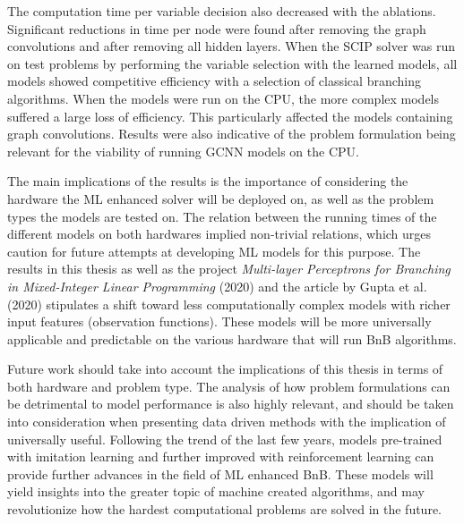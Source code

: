 The computation time per variable decision also decreased with the ablations. Significant reductions in time per node were found after removing the graph convolutions and after removing all hidden layers. When the \gls{SCIP} solver was run on test problems by performing the variable selection with the learned models, all models showed competitive efficiency with a selection of classical branching algorithms. When the models were run on the \gls{CPU}, the more complex models suffered a large loss of efficiency. This particularly affected the models containing graph convolutions. Results were also indicative of the problem formulation being relevant for the viability of running \gls{GCNN} models on the \gls{CPU}. 

The main implications of the results is the importance of considering the hardware the \gls{ML} enhanced solver will be deployed on, as well as the problem types the models are tested on. The relation between the running times of the different models on both hardwares implied non-trivial relations, which urges caution for future attempts at developing \gls{ML} models for this purpose. The results in this thesis as well as the project \textit{Multi-layer Perceptrons for Branching in Mixed-Integer Linear Programming} (2020) and the article by Gupta et al. (2020) \cite{gupta2020hybrid} stipulates a shift toward less computationally complex models with richer input features (observation functions). These models will be more universally applicable and predictable on the various hardware that will run \gls{BnB} algorithms.

Future work should take into account the implications of this thesis in terms of both hardware and problem type. The analysis of how problem formulations can be detrimental to model performance is also highly relevant, and should be taken into consideration when presenting data driven methods with the implication of universally useful. Following the trend of the last few years, models pre-trained with imitation learning and further improved with reinforcement learning can provide further advances in the field of \gls{ML} enhanced \gls{BnB}. These models will yield insights into the greater topic of machine created algorithms, and may revolutionize how the hardest computational problems are solved in the future.  

